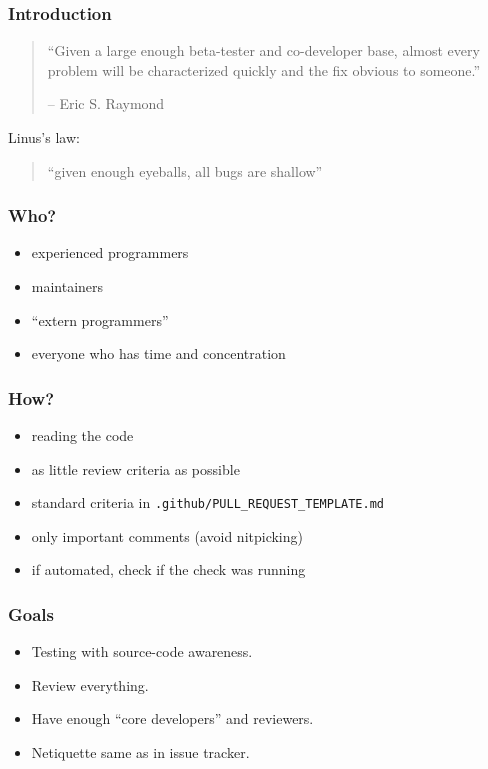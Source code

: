 \begin{frame}
	\frametitle{Introduction}

	\begin{quote}
	``Given a large enough beta-tester and co-developer base, almost every problem will be characterized quickly and the fix obvious to someone.''

	-- Eric S. Raymond
	\end{quote}

	\pause
	\vspace{2cm}

	Linus's law:
	\begin{quote}
	``given enough eyeballs, all bugs are shallow''
	\end{quote}

	\vspace{1cm}
\end{frame}

\begin{frame}[fragile]
	\frametitle{Who?}

	\begin{itemize}[<+-| alert@+>]
	\item experienced programmers
	\item maintainers
	\item ``extern programmers''
	\item everyone who has time and concentration
	\end{itemize}
\end{frame}

\begin{frame}[fragile]
	\frametitle{How?}

	\begin{itemize}[<+-| alert@+>]
	\item reading the code
	\item as little review criteria as possible
	\item standard criteria in \verb+.github/PULL_REQUEST_TEMPLATE.md+
	\item only important comments (avoid nitpicking)
	\item if automated, check if the check was running
	\end{itemize}
\end{frame}

\begin{frame}
	\frametitle{Goals}

	\begin{itemize}[<+-| alert@+>]
	\item Testing with source-code awareness.
	\item Review everything.
	\item Have enough ``core developers'' and reviewers.
	\item Netiquette same as in issue tracker.
	\end{itemize}
\end{frame}

